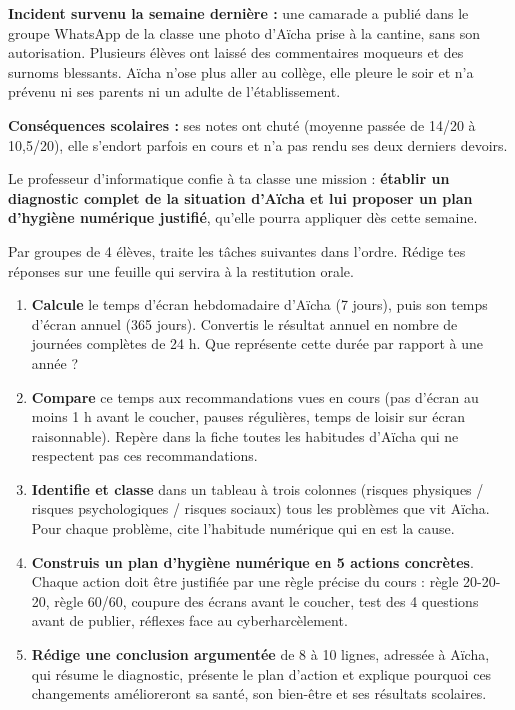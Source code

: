 \documentclass[11pt]{article}
\newcounter{popsec}
\newcounter{popsub}
\newcommand{\courssub}[1]{%
  \stepcounter{popsub}%
  \par\vspace{9pt}\noindent{\popxbold\fontsize{11.5}{13}\selectfont\color{popink}{\color{poporange}\thepopsec.\thepopsub}\hspace{6pt}#1}\par\nopagebreak\vspace{4pt}
}
\begin{document}
\textbf{Incident survenu la semaine dernière :} une camarade a publié dans le groupe WhatsApp de la classe une photo d'Aïcha prise à la cantine, sans son autorisation. Plusieurs élèves ont laissé des commentaires moqueurs et des surnoms blessants. Aïcha n'ose plus aller au collège, elle pleure le soir et n'a prévenu ni ses parents ni un adulte de l'établissement.

\textbf{Conséquences scolaires :} ses notes ont chuté (moyenne passée de 14/20 à 10,5/20), elle s'endort parfois en cours et n'a pas rendu ses deux derniers devoirs.

Le professeur d'informatique confie à ta classe une mission : \textbf{établir un diagnostic complet de la situation d'Aïcha et lui proposer un plan d'hygiène numérique justifié}, qu'elle pourra appliquer dès cette semaine.

\courssub{Consignes}

Par groupes de 4 élèves, traite les tâches suivantes dans l'ordre. Rédige tes réponses sur une feuille qui servira à la restitution orale.

\begin{enumerate}
\item \textbf{Calcule} le temps d'écran hebdomadaire d'Aïcha (7 jours), puis son temps d'écran annuel (365 jours). Convertis le résultat annuel en nombre de journées complètes de 24 h. Que représente cette durée par rapport à une année ?
\item \textbf{Compare} ce temps aux recommandations vues en cours (pas d'écran au moins 1 h avant le coucher, pauses régulières, temps de loisir sur écran raisonnable). Repère dans la fiche toutes les habitudes d'Aïcha qui ne respectent pas ces recommandations.
\item \textbf{Identifie et classe} dans un tableau à trois colonnes (risques physiques / risques psychologiques / risques sociaux) tous les problèmes que vit Aïcha. Pour chaque problème, cite l'habitude numérique qui en est la cause.
\item \textbf{Construis un plan d'hygiène numérique en 5 actions concrètes}. Chaque action doit être justifiée par une règle précise du cours : règle 20-20-20, règle 60/60, coupure des écrans avant le coucher, test des 4 questions avant de publier, réflexes face au cyberharcèlement.
\item \textbf{Rédige une conclusion argumentée} de 8 à 10 lignes, adressée à Aïcha, qui résume le diagnostic, présente le plan d'action et explique pourquoi ces changements amélioreront sa santé, son bien-être et ses résultats scolaires.
\end{enumerate}
\end{document}
